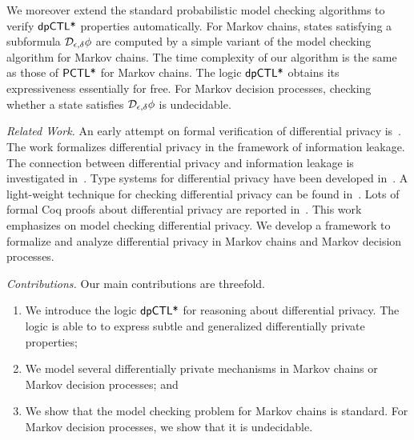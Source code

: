 
We moreover extend the standard probabilistic model checking
algorithms to verify $\textsf{dpCTL*}$ properties automatically. For Markov
chains, states
satisfying a subformula $\mathcal{D}_{{\epsilon}, {\delta}} \phi$ are computed
by a simple variant of the model checking algorithm for Markov chains.
The time complexity of our algorithm is the same as
those of $\textsf{PCTL*}$ for Markov chains. The logic $\textsf{dpCTL*}$ obtains its
expressiveness essentially for free.
For Markov decision processes, checking whether a state
satisfies $\mathcal{D}_{{\epsilon}, {\delta}} \phi$ is undecidable.


\noindent
\emph{Related Work.}
An early attempt on formal verification of differential privacy
is~\cite{TKD:11:FVDPIS}. The work formalizes differential privacy in
the framework of information leakage. The connection between
differential privacy and information leakage is investigated
in~\cite{AACDP:15:OILDPM,GMP:16:PDPFPS}. Type systems for differential
privacy have been developed
in~\cite{WHRP:17:FADP,GHHNP:13:LDPDP,RP:10:DMTGS}. A light-weight
technique for checking differential privacy can be found
in~\cite{ZK:17:LTADPP}. Lots of formal Coq proofs about differential
privacy are reported
in~\cite{BFGGHS:16:APCDP,BGGHS:16:PDPPC,BKOB:12:PRRDP,BDGKZ:13:VCDPASM,BGAHKS:14:PDPHL,BGAHRS:15:HOARRT,BFGAGHS:16:DPBP}. This
work emphasizes on model checking differential privacy. We develop a
framework to formalize and analyze differential privacy in Markov
chains and Markov decision processes.

\noindent
\emph{Contributions.} Our main contributions are threefold. 
\begin{enumerate}
\item We introduce the logic $\textsf{dpCTL*}$ for reasoning about 
differential privacy. The logic is able to to express subtle and generalized
differentially private properties;
\item We model several differentially private mechanisms in Markov chains or Markov decision processes; and
\item We show that the model checking
problem for Markov chains is standard. For Markov decision processes, we show that it is undecidable.
\end{enumerate}
